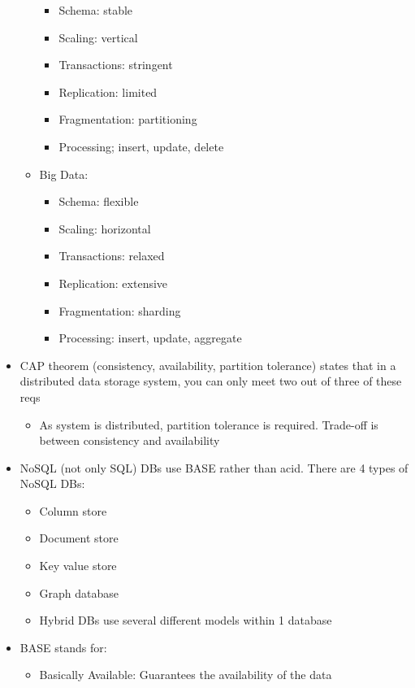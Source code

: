 \documentclass[8pt,landscape,a4paper, fleqn, dvipsnames]{extarticle}
\begin{document}
\begin{multicols*}{4}
\begin{itemize}
\begin{itemize}
\begin{itemize}
            \item Schema: stable
            \item Scaling: vertical
            \item Transactions: stringent
            \item Replication: limited
            \item Fragmentation: partitioning
            \item Processing; insert, update, delete
        \end{itemize}
        \item Big Data:
        \begin{itemize}
            \item Schema: flexible
            \item Scaling: horizontal
            \item Transactions: relaxed
            \item Replication: extensive
            \item Fragmentation: sharding
            \item Processing: insert, update, aggregate
        \end{itemize}
    \end{itemize}
    \item CAP theorem (consistency, availability, partition tolerance) states that in a distributed data storage system, you can only meet two out of three of these reqs
    \begin{itemize}
        \item As system is distributed, partition tolerance is required. Trade-off is between consistency and availability
    \end{itemize}
    \item NoSQL (not only SQL) DBs use BASE rather than acid. There are 4 types of NoSQL DBs:
    \begin{itemize}
        \item Column store
        \item Document store
        \item Key value store
        \item Graph database
        \item Hybrid DBs use several different models within 1 database
    \end{itemize}
    \item BASE stands for:
    \begin{itemize}
        \item Basically Available: Guarantees the availability of the data

\end{itemize}
\end{itemize}
\end{multicols*}
\end{document}
